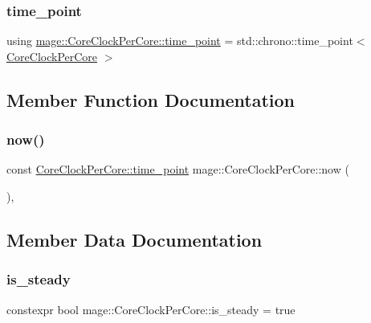 \hypertarget{structmage_1_1_core_clock_per_core_ab37b1036bb4697f16dd5dee6f169e7c3}{}\label{structmage_1_1_core_clock_per_core_ab37b1036bb4697f16dd5dee6f169e7c3} 
\subsubsection{\texorpdfstring{time\+\_\+point}{time\_point}}
{\footnotesize\ttfamily using \hyperlink{structmage_1_1_core_clock_per_core_ab37b1036bb4697f16dd5dee6f169e7c3}{mage\+::\+Core\+Clock\+Per\+Core\+::time\+\_\+point} =  std\+::chrono\+::time\+\_\+point$<$ \hyperlink{structmage_1_1_core_clock_per_core}{Core\+Clock\+Per\+Core} $>$}



\subsection{Member Function Documentation}
\hypertarget{structmage_1_1_core_clock_per_core_addc949baeeca9d24851974f2b1eb408f}{}\label{structmage_1_1_core_clock_per_core_addc949baeeca9d24851974f2b1eb408f} 
\subsubsection{\texorpdfstring{now()}{now()}}
{\footnotesize\ttfamily const \hyperlink{structmage_1_1_core_clock_per_core_ab37b1036bb4697f16dd5dee6f169e7c3}{Core\+Clock\+Per\+Core\+::time\+\_\+point} mage\+::\+Core\+Clock\+Per\+Core\+::now (\begin{DoxyParamCaption}{ }\end{DoxyParamCaption})\hspace{0.3cm}{\ttfamily [static]}, {\ttfamily [noexcept]}}



\subsection{Member Data Documentation}
\hypertarget{structmage_1_1_core_clock_per_core_af4be3201fc4c1fc55c37db59143c9865}{}\label{structmage_1_1_core_clock_per_core_af4be3201fc4c1fc55c37db59143c9865} 
\subsubsection{\texorpdfstring{is\+\_\+steady}{is\_steady}}
{\footnotesize\ttfamily constexpr bool mage\+::\+Core\+Clock\+Per\+Core\+::is\+\_\+steady = true\hspace{0.3cm}{\ttfamily [static]}}


